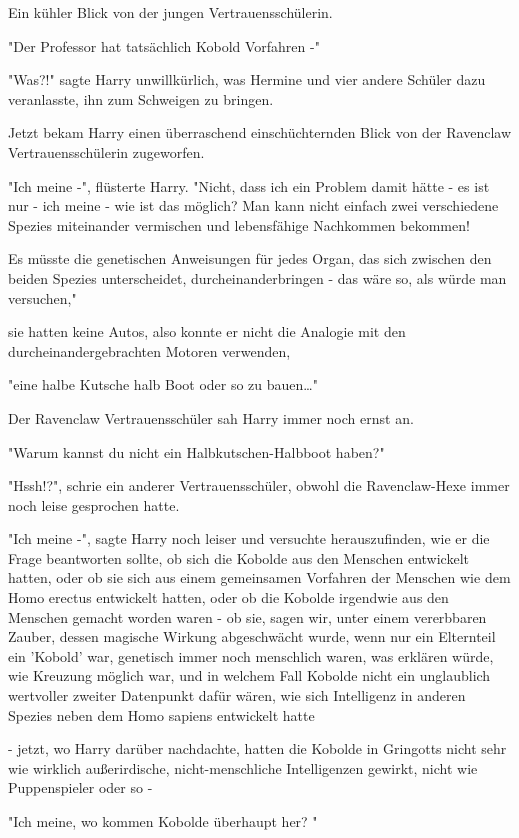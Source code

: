 {Ein kühler Blick von der jungen Vertrauensschülerin.

"Der Professor hat tatsächlich Kobold Vorfahren -"

"Was?!" sagte Harry unwillkürlich, was Hermine und vier andere Schüler dazu veranlasste, ihn zum Schweigen zu bringen.

Jetzt bekam Harry einen überraschend einschüchternden Blick von der Ravenclaw Vertrauensschülerin zugeworfen.

"Ich meine -", flüsterte Harry. "Nicht, dass ich ein Problem damit hätte - es ist nur - ich meine - wie ist das möglich? Man kann nicht einfach zwei verschiedene Spezies miteinander vermischen und lebensfähige Nachkommen bekommen!

Es müsste die genetischen Anweisungen für jedes Organ, das sich zwischen den beiden Spezies unterscheidet, durcheinanderbringen - das wäre so, als würde man versuchen,"

sie hatten keine Autos, also konnte er nicht die Analogie mit den durcheinandergebrachten Motoren verwenden,

"eine halbe Kutsche halb Boot oder so zu bauen…"

Der Ravenclaw Vertrauensschüler sah Harry immer noch ernst an.

"Warum kannst du nicht ein Halbkutschen-Halbboot haben?"

"Hssh!?", schrie ein anderer Vertrauensschüler, obwohl die Ravenclaw-Hexe immer noch leise gesprochen hatte.

"Ich meine -", sagte Harry noch leiser und versuchte herauszufinden, wie er die Frage beantworten sollte, ob sich die Kobolde aus den Menschen entwickelt hatten, oder ob sie sich aus einem gemeinsamen Vorfahren der Menschen wie dem Homo erectus entwickelt hatten, oder ob die Kobolde irgendwie aus den Menschen gemacht worden waren - ob sie, sagen wir, unter einem vererbbaren Zauber, dessen magische Wirkung abgeschwächt wurde, wenn nur ein Elternteil ein 'Kobold' war, genetisch immer noch menschlich waren, was erklären würde, wie Kreuzung möglich war, und in welchem Fall Kobolde nicht ein unglaublich wertvoller zweiter Datenpunkt dafür wären, wie sich Intelligenz in anderen Spezies neben dem Homo sapiens entwickelt hatte

- jetzt, wo Harry darüber nachdachte, hatten die Kobolde in Gringotts nicht sehr wie wirklich außerirdische, nicht-menschliche Intelligenzen gewirkt, nicht wie Puppenspieler oder so -

"Ich meine, wo kommen Kobolde überhaupt her? "

}
